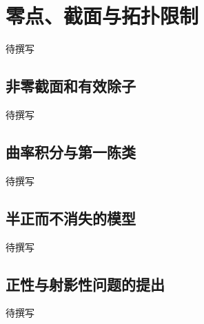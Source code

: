 
% 
% 
% 

\section{零点、截面与拓扑限制}
\label{g4:sec:1804}

待撰写

\subsection{非零截面和有效除子}
\label{g4:subsec:1804:01}
待撰写

\subsection{曲率积分与第一陈类}
\label{g4:subsec:1804:02}
待撰写

\subsection{半正而不消失的模型}
\label{g4:subsec:1804:03}
待撰写

\subsection{正性与射影性问题的提出}
\label{g4:subsec:1804:04}
待撰写
